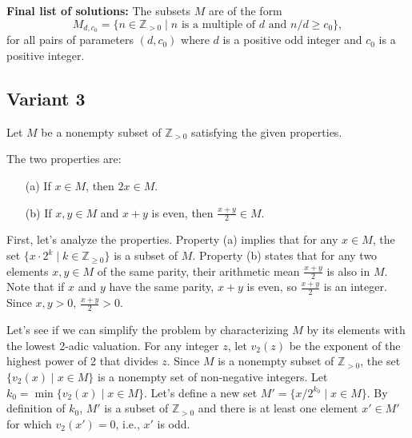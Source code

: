\documentclass[12pt,a4paper]{article}
\theoremstyle{definition}
\begin{document}
    \textbf{Final list of solutions:}
    The subsets $M$ are of the form
    \[M_{d,c_0} = \{n \in \mathbb{Z}_{>0} \mid n \text{ is a multiple of } d \text{ and } n/d \geq c_0 \},\]
    for all pairs of parameters $(d, c_0)$ where $d$ is a positive odd integer and $c_0$ is a positive integer.

\subsection{Variant 3}
    Let $M$ be a nonempty subset of $\mathbb{Z}_{>0}$ satisfying the given properties.

    The two properties are:
    \begin{enumerate}
        \item[(a)] If $x \in M$, then $2x \in M$.
        \item[(b)] If $x,y \in M$ and $x + y$ is even, then $\frac{x + y}{2} \in M$.
    \end{enumerate}

    First, let's analyze the properties.
    Property (a) implies that for any $x \in M$, the set $\{x \cdot 2^k \mid k \in \mathbb{Z}_{\geq 0}\}$ is a subset of $M$.
    Property (b) states that for any two elements $x, y \in M$ of the same parity, their arithmetic mean $\frac{x+y}{2}$ is also in $M$. Note that if $x$ and $y$ have the same parity, $x+y$ is even, so $\frac{x+y}{2}$ is an integer. Since $x, y > 0$, $\frac{x+y}{2} > 0$.

    Let's see if we can simplify the problem by characterizing $M$ by its elements with the lowest 2-adic valuation.
    For any integer $z$, let $v_2(z)$ be the exponent of the highest power of 2 that divides $z$.
    Since $M$ is a nonempty subset of $\mathbb{Z}_{>0}$, the set $\{v_2(x) \mid x \in M\}$ is a nonempty set of non-negative integers. Let $k_0 = \min\{v_2(x) \mid x \in M\}$.
    Let's define a new set $M' = \{x / 2^{k_0} \mid x \in M\}$. By definition of $k_0$, $M'$ is a subset of $\mathbb{Z}_{>0}$ and there is at least one element $x' \in M'$ for which $v_2(x')=0$, i.e., $x'$ is odd.
\end{document}

